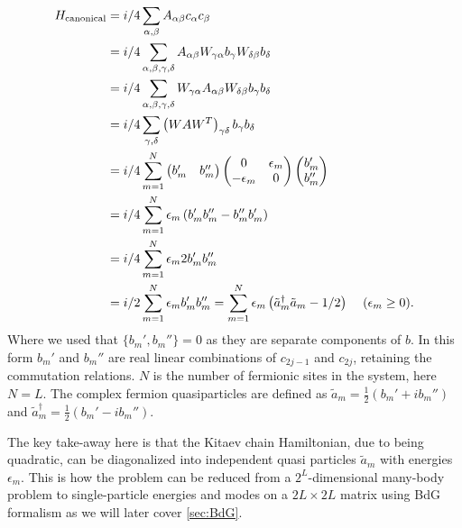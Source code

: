 \begin{align}
    H_\text{canonical} &= \frac{i}{4} \sum_{\alpha, \beta} A_{\alpha \beta} c_\alpha c_\beta\\
    &= \frac{i}{4} \sum_{\alpha, \beta, \gamma, \delta} A_{\alpha \beta} W_{\gamma \alpha} b_\gamma W_{\delta \beta} b_\delta \\
    &= \frac{i}{4} \sum_{\alpha, \beta, \gamma, \delta} W_{\gamma \alpha} A_{\alpha \beta} W_{\delta \beta} b_\gamma b_\delta\\
    &= \frac{i}{4} \sum_{\gamma, \delta} \left(W A W^T \right)_{\gamma \delta} b_\gamma b_\delta\\
    &= \frac{i}{4} \sum_{m=1}^N \begin{pmatrix}
        b_m' & b_m''
    \end{pmatrix} \begin{pmatrix}
        0 & \epsilon_m \\
        -\epsilon_m & 0
    \end{pmatrix} \begin{pmatrix}
        b_m'\\
        b_m''
    \end{pmatrix}\\
    &= \frac{i}{4} \sum_{m=1}^N \epsilon_m \left(b_m' b_m'' - b_m'' b_m' \right) \\
    &= \frac{i}{4} \sum_{m=1}^N \epsilon_m 2 b_m' b_m''\\
    &= \frac{i}{2} \sum_{m=1}^N \epsilon_m b_m' b_m'' = \sum_{m=1}^N \epsilon_m \left(\tilde{a}_m^\dagger \tilde{a}_m - \frac{1}{2} \right) \hspace{4mm} (\epsilon_m \geq 0).
\end{align}
Where we used that $\{b_m',b_m''\} = 0$ as they are separate components of $b$. In this form $b_m'$ and $b_m''$ are real linear combinations of $c_{2j-1}$ and $c_{2j}$, retaining the commutation relations. $N$ is the number of fermionic sites in the system, here $N = L$. The complex fermion quasiparticles are defined as $\tilde{a}_m = \frac{1}{2} \left( b_m' + i b_m'' \right) $ and $\tilde{a}_m^\dagger = \frac{1}{2} \left(b_m' - i b_m'' \right)$. 

The key take-away here is that the Kitaev chain Hamiltonian, due to being quadratic, can be diagonalized into independent quasi particles $\tilde{a}_m$ with energies $\epsilon_m$. This is how the problem can be reduced from a $2^L$-dimensional many-body problem to single-particle energies and modes on a $2L \times 2L$ matrix using BdG formalism as we will later cover \ref{sec:BdG}.

